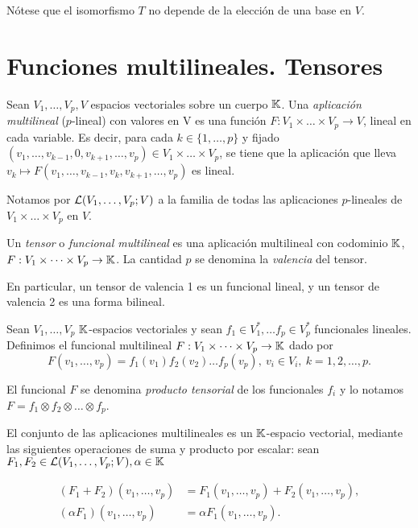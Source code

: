 Nótese que el isomorfismo \(T\) no depende de la elección de una base en
\(V\).

\section{Funciones multilineales.
Tensores}\label{funciones-multilineales.-tensores}


Sean \(V_1,\dots,V_p,V\) espacios vectoriales sobre un cuerpo \(\mathbb{K}\).
Una \emph{aplicación multilineal} (\(p\)-lineal) con valores en V es una
función \(F:V_1\times \dots\times V_p\rightarrow V\), lineal en cada
variable. Es decir, para cada \(k\in \{1,\dots, p\}\) y fijado
\((v_1,\dots,v_{k-1},0,v_{k+1},\dots,v_p)\in V_1\times \dots\times V_p\),
se tiene que la aplicación que lleva
\(v_k\mapsto F(v_1,\dots,v_{k-1},v_k,v_{k+1},\dots,v_p)\) es lineal.

Notamos por \(\mathcal{L}(V_1,\dots,V_p;V)\) a la familia de todas las
aplicaciones \(p\)-lineales de \(V_1\times \dots\times V_p\) en \(V\).



Un \emph{tensor} o \emph{funcional multilineal} es una aplicación
multilineal con codominio \(\mathbb{K}\),
\(F:V_1\times \dots\times V_p\rightarrow \mathbb{K}\). La cantidad \(p\) se
denomina la \emph{valencia} del tensor.


En particular, un tensor de valencia 1 es un funcional lineal, y un
tensor de valencia 2 es una forma bilineal.

\exampleb

Sean \(V_1,\dots,V_p\) \(\mathbb{K}\)-espacios vectoriales y sean
\(f_1\in V_1^{*},\dots f_p\in V_p^{*}\) funcionales lineales. Definimos
el funcional multilineal \(F:V_1\times\dots\times V_p\rightarrow\mathbb{K}\)
dado por
\[F(v_1,\dots,v_p)=f_1(v_1)f_2(v_2)\dots f_p(v_p),\ v_i\in V_i,\ k=1,2,\dots,p.\]

El funcional \(F\) se denomina \emph{producto tensorial} de los
funcionales \(f_i\) y lo notamos
\(F=f_1\otimes f_2\otimes\dots\otimes f_p\).

\examplee

\remb

El conjunto de las aplicaciones multilineales es un \(\mathbb{K}\)-espacio
vectorial, mediante las siguientes operaciones de suma y producto por
escalar: sean \(F_1, F_2\in \mathcal{L}(V_1,\dots,V_p;V),\alpha\in\mathbb{K}\)

\begin{align*}
(F_1+F_2)(v_1,\dots,v_p)&=F_1(v_1,\dots,v_p)+F_2(v_1,\dots,v_p),\\
(\alpha F_1)(v_1,\dots,v_p)&=\alpha F_1(v_1,\dots,v_p).
\end{align*}

